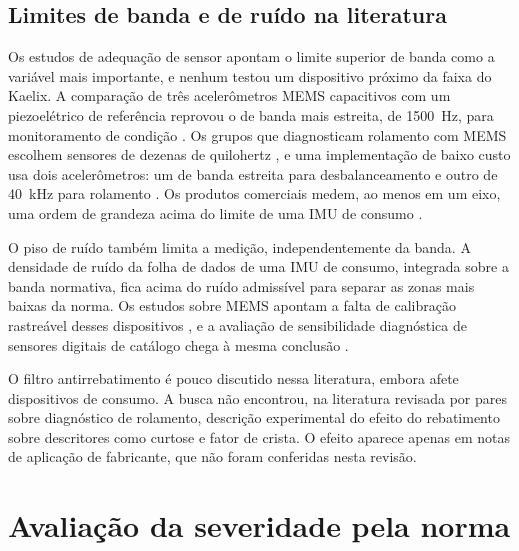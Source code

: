 \subsection{Limites de banda e de ruído na literatura}
\label{sec:rev-aquisicao}

Os estudos de adequação de sensor apontam o limite superior de banda como a variável mais importante, e nenhum testou um dispositivo
próximo da faixa do Kaelix. A comparação de três acelerômetros MEMS capacitivos com um piezoelétrico de referência reprovou o de banda
mais estreita, de \SI{1500}{\hertz}, para monitoramento de condição \cite{albarbar2008}. Os grupos que diagnosticam rolamento com MEMS
escolhem sensores de dezenas de quilohertz \cite{landi2023,sharma2024}, e uma implementação de baixo custo usa dois acelerômetros: um
de banda estreita para desbalanceamento e outro de \SI{40}{\kilo\hertz} para rolamento \cite{jakobsen2024}. Os produtos comerciais
medem, ao menos em um eixo, uma ordem de grandeza acima do limite de uma IMU de consumo
\cite{bentlynevada2025,erbessd2025,tractian2022}.

O piso de ruído também limita a medição, independentemente da banda. A densidade de ruído da folha de dados de uma IMU de consumo,
integrada sobre a banda normativa, fica acima do ruído admissível para separar as zonas mais baixas da norma. Os estudos sobre MEMS
apontam a falta de calibração rastreável desses dispositivos \cite{albarbar2008,rodrigues2021}, e a avaliação de sensibilidade
diagnóstica de sensores digitais de catálogo chega à mesma conclusão \cite{fidali2024}. 

O filtro antirrebatimento é pouco discutido nessa literatura, embora afete dispositivos de consumo. A busca não encontrou, na literatura
revisada por pares sobre diagnóstico de rolamento, descrição experimental do efeito do rebatimento sobre descritores como curtose e fator
de crista. O efeito aparece apenas em notas de aplicação de fabricante, que não foram conferidas nesta revisão.

\section{Avaliação da severidade pela norma}
\label{sec:fund-norma}

